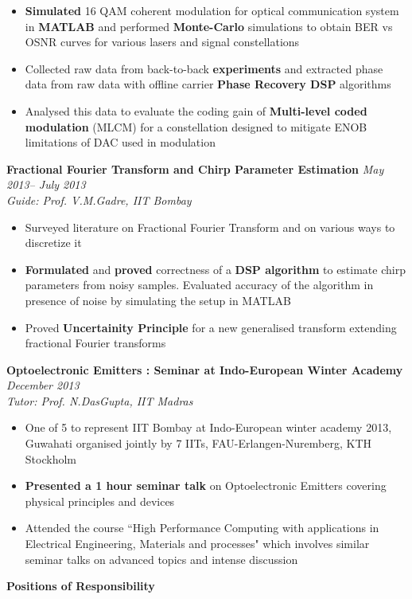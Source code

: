 \documentclass[a4paper,10pt]{article}
\newcommand{\resheading}[1]{
	{\large \colorbox{mygrey}{\begin{minipage}{\textwidth}{\textbf{#1 \vphantom{p\^{E}}}}\end{minipage}}}
}
\newcommand{\ressubheadingWithGuide}[3]{%

	\textbf{#1} \hfill \textit{#2}\null\\
	\textit{\small #3} %
	\vspace{-4pt}
}
\begin{document}
            	\begin{itemize}\itemsep -1pt
              		 \item \textbf{Simulated} 16 QAM coherent modulation for optical communication system in \textbf{MATLAB} and performed \textbf{Monte-Carlo} simulations to obtain BER vs OSNR curves for various lasers and signal constellations
					\item Collected raw data from back-to-back \textbf{experiments} and extracted phase data from raw data with offline carrier \textbf{Phase Recovery DSP} algorithms
					\item Analysed this data to evaluate the coding gain of \textbf{Multi-level coded modulation} (MLCM) for a constellation designed to mitigate ENOB limitations of DAC used in modulation
	    		\end{itemize}

        	\ressubheadingWithGuide{Fractional Fourier Transform and Chirp Parameter Estimation}{\textit{May 2013-- July 2013}}{Guide: Prof. V.M.Gadre, IIT Bombay}
            	\begin{itemize}\itemsep -1pt
            	\item Surveyed literature on Fractional Fourier Transform and on various ways to discretize it
                \item \textbf{Formulated} and \textbf{proved} correctness of a \textbf{DSP algorithm} to estimate chirp parameters from noisy samples. Evaluated accuracy of the algorithm in presence of noise by simulating the setup in MATLAB
				\item Proved \textbf{Uncertainity Principle} for a new generalised transform extending fractional Fourier transforms
				\end{itemize}
				
        	\ressubheadingWithGuide{Optoelectronic Emitters : Seminar at Indo-European Winter Academy}{\textit{December 2013}}{Tutor: Prof. N.DasGupta, IIT Madras}
            	\begin{itemize}\itemsep -1pt
					\item One of 5 to represent IIT Bombay at Indo-European winter academy 2013, Guwahati organised jointly by 7 IITs, FAU-Erlangen-Nuremberg, KTH Stockholm
					\item \textbf{Presented a 1 hour seminar talk} on Optoelectronic Emitters covering physical principles and devices
					\item Attended the course ``High Performance Computing with applications in Electrical Engineering, Materials and processes" which involves similar seminar talks on advanced topics and intense discussion
				\end{itemize}
\resheading{Positions of Responsibility}
\end{document}
